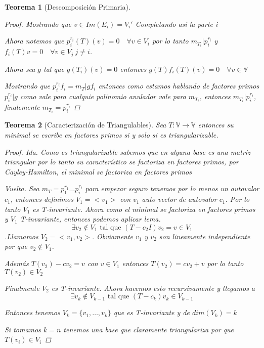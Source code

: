 \documentclass{article}
\theoremstyle{break}
\newtheorem{theorem}{Teorema}[section]
\begin{document}
\begin{theorem}[Descomposición Primaria]
\begin{proof}
      Mostrando que $v \in Im(E_i) = V_i'$ Completando asi la parte i

      Ahora notemos que $p_i^{r_i}(T)(v) = 0 \quad \forall v \in V_i $ por lo tanto $m_{T_i} | p_i^{r_i}$ y 
      $f_i(T)v = 0 \quad \forall v \in V_j \ j\neq i $. 

      Ahora sea $g$ tal que $g(T_i)(v) = 0 $ entonces $g(T)f_i(T)(v) = 0\quad \forall v \in \mathbb{V} $

      Mostrando que $p_i^{r_i}f_i = m_T | gf_i$ entonces como estamos hablando de factores primos $p_i^{r_i}|g$ como vale
      para cualquie polinomio anulador vale para $m_{T_i}$, entonces $m_{T_i}|p_i^{r_i}$, finalemente $m_{T_i} = p_i^{r_i}$
          
  \end{proof}
\end{theorem}

\begin{theorem}[Caracterización de Triangulables]
  Sea $ T: \mathbb{V} \rightarrow \mathbb{V}$ entonces su minimal se escribe en factores 
  primos si y solo si es triangularizable.
  \begin{proof}
      Ida. Como es triangularizable sabemos que en alguna base es una matriz triangular por lo tanto su característico
      se factoriza en factores primos, por Cayley-Hamilton, el minimal se factoriza en factores primos

      Vuelta. Sea $m_T = p_1^{r_1}\ldots p_i^{r_i}$ para empezar seguro tenemos por lo menos un autovalor $c_1$,
      entonces definimos $V_1 = <v_1>$ con $v_1$ auto vector de autovalor $c_1$. Por lo tanto $V_1$ es T-invariante.
      Ahora como el minimal se factoriza en factores primos y $V_1$ T-invariante, entonces podemos aplicar lema.
      $$\exists v_2 \notin V_1 \text{ tal que } (T-c_2I)v_2 = v \in V_1$$.Llamamos $V_2 = <v_1,v_2>$. Obviamente $v_1$ y $v_2$ son
      lineamente independiente por que $v_2 \notin V_1$.

      Además $T(v_2) - cv_2 = v$ con $v\in V_1$ entonces $T(v_2) = cv_2 + v$ por lo tanto $T(v_2) \in V_2$

      Finalmente $V_2$ es T-invariante. Ahora hacemos esto recursivamente y llegamos a 
      $$ \exists v_k \notin V_{k-1} \text{ tal que } (T-c_k)v_k \in V_{k-1}$$

      Entonces tenemos $V_{k} = \{v_1,\ldots,v_k\}$ que es T-invariante y de $dim(V_k) = k$

      Si tomamos $k=n$ tenemos una base que claramente triangulariza por que $T(v_i)\in V_{i}$
  \end{proof}
\end{theorem}
\end{document}
